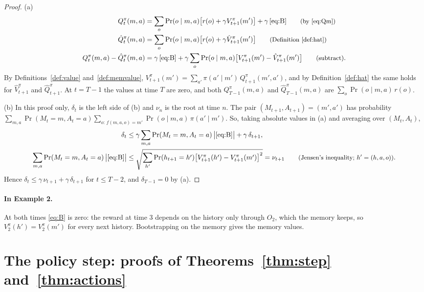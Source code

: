 \documentclass{article}
\theoremstyle{definition}
\newcommand{\why}[1]{\tag*{\small(#1)}}
\begin{document}
\begin{proof}
(a)
\begin{align*}
Q^\pi_t(m,a)&=\sum_o\Pr(o\mid m,a)\big[r(o)+\gamma V^\pi_{t+1}(m')\big]+\gamma\,\eqref{eq:B} \why{by \eqref{eq:Qm}}\\
\hat Q^\pi_t(m,a)&=\sum_o\Pr(o\mid m,a)\big[r(o)+\gamma\hat V^\pi_{t+1}(m')\big] \why{Definition~\ref{def:hat}}\\
Q^\pi_t(m,a)-\hat Q^\pi_t(m,a)&=\gamma\,\eqref{eq:B}+\gamma\sum_o\Pr(o\mid m,a)\big[V^\pi_{t+1}(m')-\hat V^\pi_{t+1}(m')\big] \why{subtract}.
\end{align*}
By Definitions~\ref{def:value} and~\ref{def:memvalue}, $V^\pi_{t+1}(m')=\sum_{a'}\pi(a'\mid m')\,Q^\pi_{t+1}(m',a')$, and by Definition~\ref{def:hat} the same holds for $\hat V^\pi_{t+1}$ and $\hat Q^\pi_{t+1}$. At $t=T-1$ the values at time $T$ are zero, and both $Q^\pi_{T-1}(m,a)$ and $\hat Q^\pi_{T-1}(m,a)$ are $\sum_o\Pr(o\mid m,a)\,r(o)$.

(b) In this proof only, $\delta_t$ is the left side of (b) and $\nu_n$ is the root at time $n$. The pair $(M_{t+1},A_{t+1})=(m',a')$ has probability $\sum_{m,a}\Pr(M_t=m,A_t=a)\sum_{o:\,f(m,a,o)=m'}\Pr(o\mid m,a)\,\pi(a'\mid m')$. So, taking absolute values in (a) and averaging over $(M_t,A_t)$,
\begin{align*}
\delta_t&\le\gamma\sum_{m,a}\Pr(M_t=m,A_t=a)\,\big|\eqref{eq:B}\big|+\gamma\,\delta_{t+1},\\
\sum_{m,a}\Pr(M_t=m,A_t=a)\,\big|\eqref{eq:B}\big|&\le\sqrt{\sum_{h'}\Pr(h_{t+1}=h')\big[V^\pi_{t+1}(h')-V^\pi_{t+1}(m')\big]^2}=\nu_{t+1} \why{Jensen's inequality; $h'=(h,a,o)$}.
\end{align*}
Hence $\delta_t\le\gamma\,\nu_{t+1}+\gamma\,\delta_{t+1}$ for $t\le T-2$, and $\delta_{T-1}=0$ by (a).
\end{proof}

\paragraph{In Example 2.} At both times \eqref{eq:B} is zero: the reward at time $3$ depends on the history only through $O_2$, which the memory keeps, so $V^\pi_2(h')=V^\pi_2(m')$ for every next history. Bootstrapping on the memory gives the memory values.

\section{The policy step: proofs of Theorems~\ref{thm:step} and~\ref{thm:actions}}\label{sec:stepproof}
\end{document}
